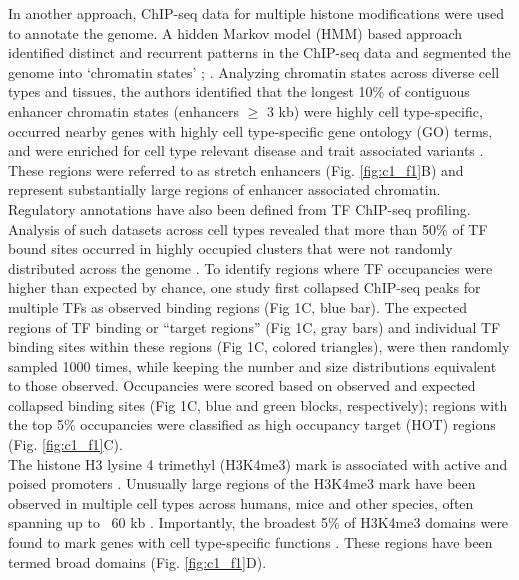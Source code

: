 In another approach, ChIP-seq data for multiple histone modifications were used to annotate the genome. A hidden Markov model (HMM) based approach identified distinct and recurrent patterns in the ChIP-seq data and segmented the genome into ‘chromatin states’ \cite{ernstMappingAnalysisChromatin2011}; \cite{ernstChromHMMAutomatingChromatin2012}. Analyzing chromatin states across diverse cell types and tissues, the authors identified that the longest 10\% of contiguous enhancer chromatin states (enhancers $\geq$ 3 kb) were highly cell type-specific, occurred nearby genes with highly cell type-specific gene ontology (GO) terms, and were enriched for cell type relevant disease and trait associated variants \cite{parkerChromatinStretchEnhancer2013}. These regions were referred to as stretch enhancers \cite{parkerChromatinStretchEnhancer2013} (Fig. \ref{fig:c1_f1}B) and represent substantially large regions of enhancer associated chromatin. \\

Regulatory annotations have also been defined from TF ChIP-seq profiling. Analysis of such datasets across cell types revealed that more than 50\% of TF bound sites occurred in highly occupied clusters that were not randomly distributed across the genome \cite{moormanHotspotsTranscriptionFactor2006, themodencodeconsortiumIdentificationFunctionalElements2010, theencodeprojectconsortiumIntegratedEncyclopediaDNA2012, boyleComparativeAnalysisRegulatory2014}. To identify regions where TF occupancies were higher than expected by chance, one study first collapsed ChIP-seq peaks for multiple TFs as observed binding regions (Fig 1C, blue bar). The expected regions of TF binding or “target regions” (Fig 1C, gray bars) and individual TF binding sites within these regions (Fig 1C, colored triangles), were then randomly sampled 1000 times, while keeping the number and size distributions equivalent to those observed. Occupancies were scored based on observed and expected collapsed binding sites (Fig 1C, blue and green blocks, respectively); regions with the top 5\% occupancies were classified as high occupancy target (HOT) regions (Fig. \ref{fig:c1_f1}C). \\

The histone H3 lysine 4 trimethyl (H3K4me3) mark is associated with active and poised promoters \cite{bernsteinBivalentChromatinStructure2006, mikkelsenGenomewideMapsChromatin2007,adliGenomewideChromatinMaps2010}. Unusually large regions of the H3K4me3 mark have been observed in multiple cell types across humans, mice and other species, often spanning up to ~60 kb \cite{adliGenomewideChromatinMaps2010,benayounH3K4me3BreadthLinked2014,chenBroadH3K4me3Associated2015}. Importantly, the broadest 5\% of H3K4me3 domains were found to mark genes with cell type-specific functions \cite{benayounH3K4me3BreadthLinked2014,thibodeauChromatinInteractionNetworks2017}. These regions have been termed broad domains (Fig. \ref{fig:c1_f1}D). \\

